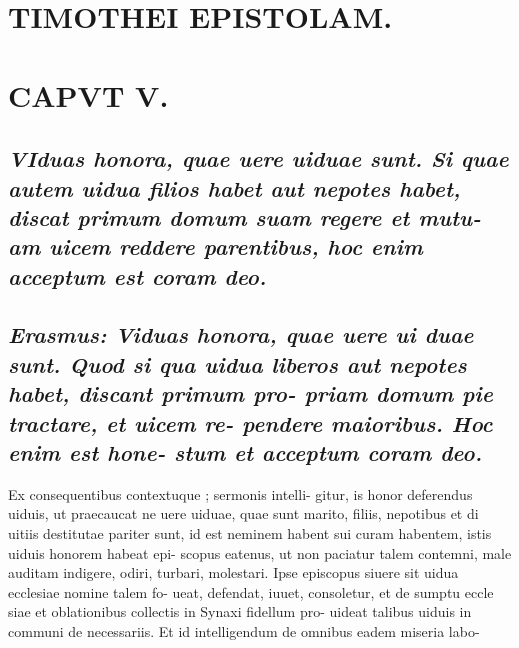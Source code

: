 \documentclass{article}
\begin{document}
\begin{pages}
\section*{TIMOTHEI EPISTOLAM. }
\marginpar{[ p.117 ]}
\endnumbering\beginnumbering\section{CAPVT V.}
{}
\subsection*{\textit{\huge\textbf{V}\normalsize Iduas honora, quae uere uiduae sunt. Si quae autem uidua filios habet aut nepotes habet, discat primum domum suam regere et mutu- am uicem reddere parentibus, hoc enim acceptum est coram deo. }}
{}
\subsection*{\textit{Erasmus: Viduas honora, quae uere ui duae sunt. Quod si qua uidua liberos aut nepotes habet, discant primum pro- priam domum pie tractare, et uicem re- pendere maioribus. Hoc enim est hone- stum et acceptum coram deo. }}\pstart Ex consequentibus contextuque ; sermonis intelli- gitur, is honor deferendus uiduis, ut praecaucat ne uere uiduae, quae sunt marito, filiis, nepotibus et di uitiis destitutae pariter sunt, id est neminem habent sui curam habentem, istis uiduis honorem habeat epi- scopus eatenus, ut non paciatur talem contemni, male auditam indigere, odiri, turbari, molestari. Ipse episcopus siuere sit uidua ecclesiae nomine talem fo- ueat, defendat, iuuet, consoletur, et de sumptu eccle siae et oblationibus collectis in Synaxi fidellum pro- uideat talibus uiduis in communi de necessariis. Et id intelligendum de omnibus eadem miseria labo-  \pend

\end{pages}
\end{document}

